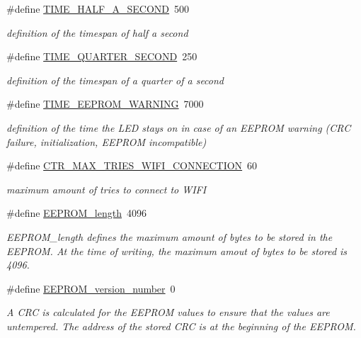 \begin{DoxyCompactItemize}
\#define \hyperlink{WIFIOnOff_8ino_a87a8a26f2f6a9e14484ae0efabe91c99}{T\-I\-M\-E\-\_\-\-H\-A\-L\-F\-\_\-\-A\-\_\-\-S\-E\-C\-O\-N\-D}~500
\begin{DoxyCompactList}\small\item\em definition of the timespan of half a second \end{DoxyCompactList}\item 
\#define \hyperlink{WIFIOnOff_8ino_af01b3f2fe9f05e4ead3b1957d5402397}{T\-I\-M\-E\-\_\-\-Q\-U\-A\-R\-T\-E\-R\-\_\-\-S\-E\-C\-O\-N\-D}~250
\begin{DoxyCompactList}\small\item\em definition of the timespan of a quarter of a second \end{DoxyCompactList}\item 
\#define \hyperlink{WIFIOnOff_8ino_ad32448a40ca9e5dc0a62149d0f08bd5f}{T\-I\-M\-E\-\_\-\-E\-E\-P\-R\-O\-M\-\_\-\-W\-A\-R\-N\-I\-N\-G}~7000
\begin{DoxyCompactList}\small\item\em definition of the time the L\-E\-D stays on in case of an E\-E\-P\-R\-O\-M warning (C\-R\-C failure, initialization, E\-E\-P\-R\-O\-M incompatible) \end{DoxyCompactList}\item 
\#define \hyperlink{WIFIOnOff_8ino_a5b5893eb38e4fe69dc2acd2f974fa5cb}{C\-T\-R\-\_\-\-M\-A\-X\-\_\-\-T\-R\-I\-E\-S\-\_\-\-W\-I\-F\-I\-\_\-\-C\-O\-N\-N\-E\-C\-T\-I\-O\-N}~60
\begin{DoxyCompactList}\small\item\em maximum amount of tries to connect to W\-I\-F\-I \end{DoxyCompactList}\item 
\#define \hyperlink{WIFIOnOff_8ino_af7399e3a75be0250095968af4f94757e}{E\-E\-P\-R\-O\-M\-\_\-length}~4096
\begin{DoxyCompactList}\small\item\em E\-E\-P\-R\-O\-M\-\_\-length defines the maximum amount of bytes to be stored in the E\-E\-P\-R\-O\-M. At the time of writing, the maximum amout of bytes to be stored is 4096. \end{DoxyCompactList}\item 
\#define \hyperlink{WIFIOnOff_8ino_aa3109b452678c4716d01ff98ce34a2da}{E\-E\-P\-R\-O\-M\-\_\-version\-\_\-number}~0
\begin{DoxyCompactList}\small\item\em A C\-R\-C is calculated for the E\-E\-P\-R\-O\-M values to ensure that the values are untempered. The address of the stored C\-R\-C is at the beginning of the E\-E\-P\-R\-O\-M. \end{DoxyCompactList}\item 

\end{DoxyCompactItemize}
